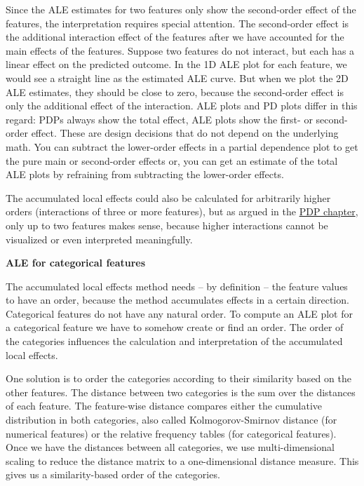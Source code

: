 \documentclass[
  11pt,
]{scrbook}
\begin{document}
Since the ALE estimates for two features only show the second-order effect of the features, the interpretation requires special attention.
The second-order effect is the additional interaction effect of the features after we have accounted for the main effects of the features.
Suppose two features do not interact, but each has a linear effect on the predicted outcome.
In the 1D ALE plot for each feature, we would see a straight line as the estimated ALE curve.
But when we plot the 2D ALE estimates, they should be close to zero, because the second-order effect is only the additional effect of the interaction.
ALE plots and PD plots differ in this regard:
PDPs always show the total effect, ALE plots show the first- or second-order effect.
These are design decisions that do not depend on the underlying math.
You can subtract the lower-order effects in a partial dependence plot to get the pure main or second-order effects or, you can get an estimate of the total ALE plots by refraining from subtracting the lower-order effects.

The accumulated local effects could also be calculated for arbitrarily higher orders (interactions of three or more features), but as argued in the \protect\hyperlink{pdp}{PDP chapter}, only up to two features makes sense, because higher interactions cannot be visualized or even interpreted meaningfully.

\textbf{ALE for categorical features}

The accumulated local effects method needs -- by definition -- the feature values to have an order, because the method accumulates effects in a certain direction.
Categorical features do not have any natural order.
To compute an ALE plot for a categorical feature we have to somehow create or find an order.
The order of the categories influences the calculation and interpretation of the accumulated local effects.

One solution is to order the categories according to their similarity based on the other features.
The distance between two categories is the sum over the distances of each feature.
The feature-wise distance compares either the cumulative distribution in both categories, also called Kolmogorov-Smirnov distance (for numerical features) or the relative frequency tables (for categorical features).
Once we have the distances between all categories, we use multi-dimensional scaling to reduce the distance matrix to a one-dimensional distance measure.
This gives us a similarity-based order of the categories.
\end{document}
